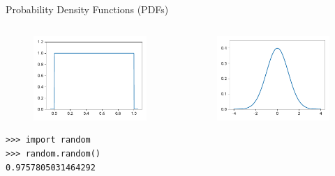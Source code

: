 \documentclass[12pt, aspectratio=149]{beamer}
\theoremstyle{plain}
\begin{document}
\begin{frame}[fragile]{Probability Density Functions (PDFs)}
\begin{columns}
\begin{column}{0.5\textwidth}
    \begin{center}
     \begin{figure}
     	\centering
     	\includegraphics[width=0.99\linewidth]{figures/uniform}
     \end{figure}
     \begin{verbatim}
>>> import random
>>> random.random()
0.9757805031464292
     \end{verbatim}
     \end{center}
\end{column}
\begin{column}{0.5\textwidth}  %
    \begin{center}
     \begin{figure}
     	\centering
     	\includegraphics[width=0.99\linewidth]{figures/normal}

\end{figure}
\end{center}
\end{column}
\end{columns}
\end{frame}
\end{document}
